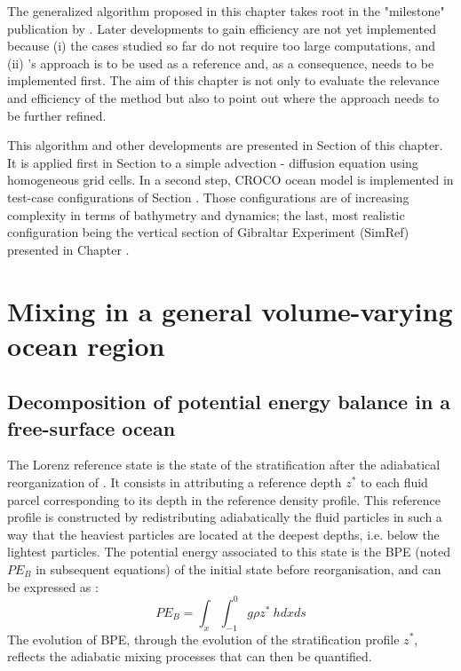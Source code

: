 The generalized algorithm proposed in this chapter takes root in the "milestone" publication by \citet{winters_available_1995}. Later developments to gain efficiency are not yet implemented because (i) the cases studied so far do not require too large computations, and (ii) \citet{winters_available_1995}'s approach is to be used as a reference and, as a consequence, needs to be implemented first. The aim of this chapter is not only to evaluate the relevance and efficiency of the method but also to point out where the approach needs to be further refined.

This algorithm and other developments are presented in Section  of this chapter. It is applied first in Section  to a simple advection - diffusion equation using homogeneous grid cells. In a second step, CROCO ocean model is implemented in test-case configurations of Section . Those configurations are of increasing complexity in terms of bathymetry and dynamics; the last, most realistic configuration being the vertical section of Gibraltar Experiment (SimRef) presented in Chapter .

\section{Mixing in a general volume-varying ocean region}
\label{section_mix_vol}
\subsection{Decomposition of potential energy balance in a free-surface ocean}
\label{section_PE_chap2}

The Lorenz reference state is the state of the stratification after the adiabatical reorganization of \citet{lorenz_available_1955}. It consists in attributing a reference depth $z^*$ to each fluid parcel corresponding to its depth in the reference density profile. This reference profile is constructed by redistributing adiabatically the fluid particles in such a way that the heaviest particles are located at the deepest depths, i.e. below the lightest particles. The potential energy associated to this state is the BPE (noted $PE_B$ in subsequent equations) of the initial state before reorganisation, and can be expressed as :
\begin{equation}
    PE_B = \int_x \int_{-1}^0 g \rho z^* \ h dx ds
\end{equation}
The evolution of BPE, through the evolution of the stratification profile $z^*$, reflects the adiabatic mixing processes that can then be quantified.

